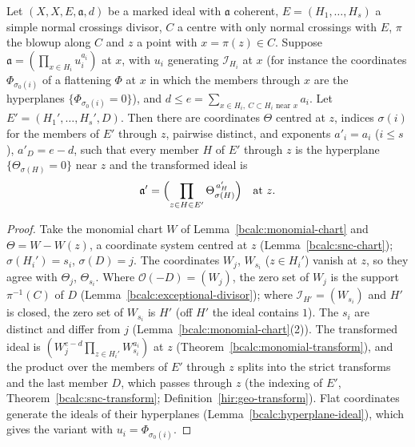 \begin{corollary}
\label{bcalc:monomial-transform-coords}
\mixedleanok
Let \((X,X,E,\mathfrak a,d)\) be a marked ideal with \(\mathfrak a\) coherent, \(E=(H_1,\dots,H_s)\) a simple normal crossings divisor, \(C\) a centre with only
normal crossings with \(E\), \(\pi\) the blowup along \(C\) and \(z\) a point with \(x=\pi(z)\in C\). Suppose \(\mathfrak a=(\prod_{x\in H_i}u_i^{a_i})\) at \(x\), with
\(u_i\) generating \(\mathcal I_{H_i}\) at \(x\) (for instance the coordinates \(\Phi_{\sigma_0(i)}\) of a flattening \(\Phi\) at \(x\) in which the members through
\(x\) are the hyperplanes \(\{\Phi_{\sigma_0(i)}=0\}\)), and \(d\le e=\sum_{x\in H_i,\ C\subset H_i\text{ near }x}a_i\). Let \(E'=(H_1',\dots,H_s',D)\). Then there
are coordinates \(\Theta\) centred at \(z\), indices \(\sigma(i)\) for the members of \(E'\) through \(z\), pairwise distinct, and exponents \(a'_i=a_i\)
(\(i\le s\)), \(a'_D=e-d\), such that every member \(H\) of \(E'\) through \(z\) is the hyperplane \(\{\Theta_{\sigma(H)}=0\}\) near \(z\) and the transformed ideal is
\[
 \mathfrak a'=\Bigl(\prod_{z\in H\in E'}\Theta_{\sigma(H)}^{\,a'_H}\Bigr)\quad\text{at }z .
\]
\end{corollary}
\begin{proof}
\mixedleanok
Take the monomial chart \(W\) of Lemma~\ref{bcalc:monomial-chart} and \(\Theta=W-W(z)\), a coordinate system centred at \(z\) (Lemma~\ref{bcalc:snc-chart});
\(\sigma(H_i')=s_i\), \(\sigma(D)=j\). The coordinates \(W_j\), \(W_{s_i}\) (\(z\in H_i'\)) vanish at \(z\), so they agree with \(\Theta_j\), \(\Theta_{s_i}\). Where
\(\mathcal O(-D)=(W_j)\), the zero set of \(W_j\) is the support \(\pi^{-1}(C)\) of \(D\) (Lemma~\ref{bcalc:exceptional-divisor}); where \(\mathcal I_{H'}=(W_{s_i})\) and
\(H'\) is closed, the zero set of \(W_{s_i}\) is \(H'\) (off \(H'\) the ideal contains \(1\)). The \(s_i\) are distinct and differ from \(j\)
(Lemma~\ref{bcalc:monomial-chart}(2)). The transformed ideal is \((W_j^{e-d}\prod_{z\in H_i'}W_{s_i}^{a_i})\) at \(z\) (Theorem~\ref{bcalc:monomial-transform}), and the
product over the members of \(E'\) through \(z\) splits into the strict transforms and the last member \(D\), which passes through \(z\) (the indexing of \(E'\),
Theorem~\ref{bcalc:snc-transform}; Definition~\ref{hir:geo-transform}). Flat coordinates generate the ideals of their hyperplanes
(Lemma~\ref{bcalc:hyperplane-ideal}), which gives the variant with \(u_i=\Phi_{\sigma_0(i)}\).
\end{proof}

